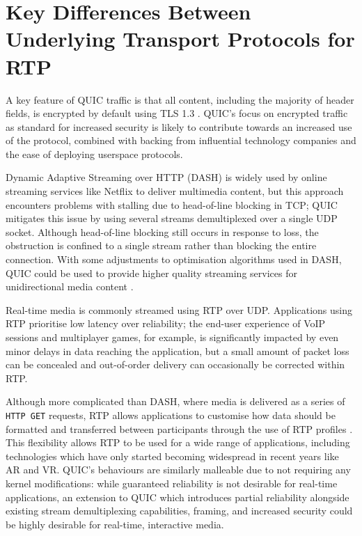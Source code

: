 \documentclass{mprop}
\begin{document}
\section{Key Differences Between Underlying Transport Protocols for RTP}

A key feature of QUIC traffic is that all content, including the majority of header fields, is 
encrypted by default using TLS 1.3 \cite{quic-transport-16}. QUIC's focus on encrypted traffic as 
standard for increased security is likely to contribute towards an increased use of the protocol, 
combined with backing from influential technology companies and the ease of deploying userspace 
protocols.

Dynamic Adaptive Streaming over HTTP (DASH) is widely used by online streaming services like 
Netflix to deliver multimedia content, but this approach encounters problems with stalling due to 
head-of-line blocking in TCP; QUIC mitigates this issue by using several streams demultiplexed 
over a single UDP socket. Although head-of-line blocking still occurs in response to loss, the 
obstruction is confined to a single stream rather than blocking the entire connection. With some 
adjustments to optimisation algorithms used in DASH, QUIC could be used to provide higher quality 
streaming services for unidirectional media content \cite{Bhat2017}.

Real-time media is commonly streamed using RTP over UDP. Applications using RTP prioritise low 
latency over reliability; the end-user experience of VoIP sessions and multiplayer games, for 
example, is significantly impacted by even minor delays in data reaching the application, but a 
small amount of packet loss can be concealed and out-of-order delivery can occasionally be 
corrected within RTP.

Although more complicated than DASH, where media is delivered as a series of \texttt{HTTP GET} 
requests, RTP allows applications to customise how data should be formatted and transferred 
between participants through the use of RTP profiles \cite{RTP-RFC}. This flexibility allows RTP 
to be used for a wide range of applications, including technologies which have only started 
becoming widespread in recent years like AR and VR. QUIC's behaviours are similarly malleable due 
to not requiring any kernel modifications: while guaranteed reliability is not desirable for 
real-time applications, an extension to QUIC which introduces partial reliability alongside 
existing stream demultiplexing capabilities, framing, and increased security could be highly 
desirable for real-time, interactive media.
\end{document}
